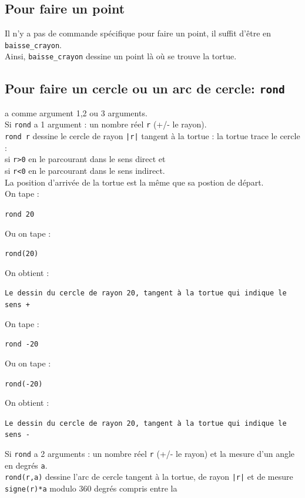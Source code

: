 \documentclass[a4paper,11pt]{book}
\begin{document}
\subsection{Pour faire un point}
Il n'y a pas de commande sp\'ecifique pour faire un point,
il suffit d'\^etre en {\tt baisse\_crayon}.\\
Ainsi, {\tt baisse\_crayon} dessine un point l\`a o\`u se trouve la tortue.

\subsection{Pour faire un cercle ou un arc de cercle: {\tt rond}}
 a comme argument 1,2 ou 3 arguments.\\
Si {\tt rond} a 1 argument : un nombre r\'eel {\tt r} (+/- le rayon).\\
{\tt rond r} dessine le cercle de rayon {\tt |r|} tangent \`a la tortue :
la tortue trace le cercle :\\
 si {\tt r>0} en le parcourant dans le sens direct et\\
 si {\tt r<0} en le parcourant dans le sens indirect.\\
La position d'arriv\'ee de la tortue est la m\^eme que sa postion de d\'epart.\\
On tape :
\begin{center}{\tt rond 20}\end{center}
Ou on tape :
\begin{center}{\tt rond(20)}\end{center}
On obtient :
\begin{center}{\tt Le dessin du cercle de rayon 20, tangent \`a la tortue qui indique le sens +}\end{center}
On tape :
\begin{center}{\tt rond -20}\end{center}
Ou on tape :
\begin{center}{\tt rond(-20)}\end{center}
On obtient :
\begin{center}{\tt Le dessin du cercle de rayon 20, tangent \`a la tortue qui indique le sens -}\end{center}
Si {\tt rond} a 2 arguments : un nombre r\'eel {\tt r} (+/- le rayon) et la 
mesure d'un angle en degr\'es {\tt a}.\\
{\tt rond(r,a)} dessine l'arc de cercle tangent \`a la tortue, de rayon 
{\tt |r|} et de mesure {\tt signe(r)*a} modulo 360 degr\'es compris entre la 
\end{document}
